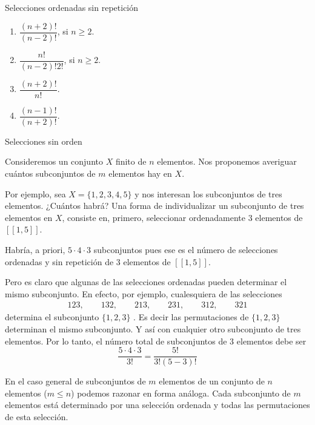 \begin{section}{Selecciones ordenadas sin repetición}
\begin{multicols}{2}
\begin{enumerate}
    \item $ \dfrac{(n + 2)!}{( n - 2 ) !}$, \qquad si $n \geq 2$.
    
    \item $\dfrac{n!}{(n-2)! 2!} $, \qquad si $n \geq 2$.
    
    \item $\dfrac{(n + 2)!}{n!}$.
    
    \item $\dfrac{(n-1)!}{(n + 2)!}$.
\end{enumerate}            
    \end{multicols}

\end{section}

\begin{section}{Selecciones sin orden}

Consideremos un conjunto $X$ finito de $n$ elementos. Nos proponemos averiguar cuántos subconjuntos de $m$ elementos hay en $X$.

\begin{ejemplo*}
Por ejemplo, sea $X = \{ 1, 2, 3, 4, 5 \}$ y nos interesan los subconjuntos de tres ele\-men\-tos. ¿Cuántos habrá? Una forma de individualizar un subconjunto de tres elementos en $X$, consiste en, primero, seleccionar  ordenadamente $3$ elementos de $[[ 1 , 5 ]]$. 

Habría, a priori, $5 \cdot 4 \cdot 3$ subconjuntos pues ese es el número de selecciones ordenadas y sin repetición de $3$ elementos de $[[ 1 , 5 ]]$.

Pero es claro que algunas de las selecciones ordenadas pueden determinar el mismo subconjunto. En efecto, por ejemplo, cualesquiera de las selecciones
\begin{align*}
1 2 3, \qquad  1 3 2, \qquad  2 1 3, \qquad 2 3 1, \qquad  3 1 2, \qquad  3 2 1
\end{align*}
determina el subconjunto $\{ 1, 2, 3\}$ . Es decir las permutaciones de $\{ 1, 2, 3\}$ determinan el mismo subconjunto.  Y así con cualquier otro
subconjunto de tres elementos. Por lo tanto, el número total de
subconjuntos de $3$ elementos debe ser
$$
\frac{5 \cdot 4 \cdot 3}{3!} =  \frac{5!}{3! (5 - 3)!}
$$
\end{ejemplo*}


En el caso general de subconjuntos de $m$ elementos de un
conjunto de $n$ elementos ($m \le n$) podemos razonar en forma análoga. Cada
subconjunto de $m$ elementos está determinado por una selección ordenada y todas las permutaciones de esta selección.


\end{section}
